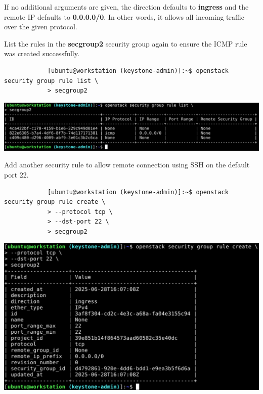 \documentclass[letterpaper, 12pt]{article}
\begin{document}
\begin{enumerate}
    \begin{notebox}
        If no additional arguments are given, the direction defaults to \textbf{ingress} and the remote IP defaults to \textbf{0.0.0.0/0}.
        In other words, it allows all incoming traffic over the given protocol.
    \end{notebox}

    \begin{labstep}
        List the rules in the \textbf{secgroup2} security group again to ensure the ICMP rule was created successfully.
        \begin{lstlisting}
            [ubuntu@workstation (keystone-admin)]:~$ openstack security group rule list \
            > secgroup2
        \end{lstlisting}

        \begin{center}
            \includegraphics[width=\linewidth]{images/part1/step20.png}
        \end{center}
    \end{labstep}

    \begin{labstep}
        Add another security rule to allow remote connection using SSH on the default port 22.
        \begin{lstlisting}
            [ubuntu@workstation (keystone-admin)]:~$ openstack security group rule create \
            > --protocol tcp \
            > --dst-port 22 \
            > secgroup2
        \end{lstlisting}

        \begin{center}
            \includegraphics[width=\linewidth]{images/part1/step21.png}
        \end{center}
    \end{labstep}


\end{enumerate}
\end{document}
